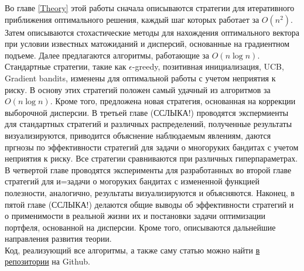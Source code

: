 Во главе \ref{Theory} этой работы сначала описываются стратегии для итеративного приближения оптимального решения, каждый шаг которых работает за $O(n^2)$. Затем описываются стохастические методы для нахождения оптимального вектора при условии известных матожиданий и дисперсий, основанные на градиентном подъеме. Далее предлагаются алгоритмы, работающие за $O(n \log n)$. Стандартные стратегии, такие как $\epsilon$-greedy, позитивная инициализация, UCB, Gradient bandits, изменены для оптимальной работы с учетом неприятия к риску. В основу этих стратегий положен самый удачный из алгоритмов за $O(n \log n)$. Кроме того, предложена новая стратегия, основанная на коррекции выборочной дисперсии. В третьей главе (ССЛЫКА!) проводятся экспермиенты для стандартных стратегий и различных распределений, полученные результаты визуализируются, приводится объяснение наблюдаемым явлениям, даются пргнозы по эффективности стратегий для задачи о многоруких бандитах с учетом неприятия к риску. Все стратегии сравниваются при различных гиперпараметрах. В четвертой главе проводятся эксперименты для разработанных во второй главе стратегий для и=задачи о могоруких бандитах с измененной функцией полезности, аналогично, результаты визуализируются и объясняются. Наконец, в пятой главе (ССЛЫКА!) делаются общие выводы об эффективности стратегий и о применимости в реальной жизни их и постановки задачи оптимизации портфеля, основанной на дисперсии. Кроме того, описываются дальнейшие направления развития теории. \\

Код, реализующий все алгоритмы, а также саму статью можно найти \href{https://github.com/davynchi/diploma/blob/main}{в репозитории} на Github.











